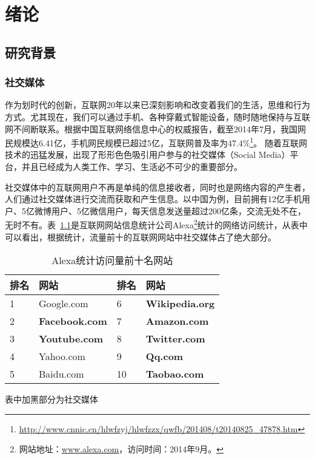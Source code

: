 \chapter{绪论}
\label{Intro}

\section{研究背景}

\subsection{社交媒体}
\label{ch1_social}
作为划时代的创新，互联网20年以来已深刻影响和改变着我们的生活，思维和行为方式。尤其现在，我们可以通过手机、各种穿戴式智能设备，随时随地保持与互联网不间断联系。根据中国互联网络信息中心的权威报告，截至2014年7月，我国网民规模达6.41亿，手机网民规模已超过5亿，互联网普及率为47.4\%\footnote{\url{http://www.cnnic.cn/hlwfzyj/hlwfzzx/qwfb/201408/t20140825\_47878.htm}}。
随着互联网技术的迅猛发展，出现了形形色色吸引用户参与的社交媒体（Social Media）平台，并且已经成为人类工作、学习、生活必不可少的重要部分。


社交媒体中的互联网用户不再是单纯的信息接收者，同时也是网络内容的产生者，人们通过社交媒体进行交流而获取和产生信息。以中国为例，目前拥有12亿手机用户、5亿微博用户、5亿微信用户，每天信息发送量超过200亿条，交流无处不在，无时不有。表~\ref{tab1-1}是互联网网站信息统计公司Alexa\footnote{网站地址：\url{www.alexa.com}，访问时间：2014年9月。}统计的网络访问统计，从表中可以看出，根据统计，流量前十的互联网网站中社交媒体占了绝大部分。

\begin{table}[htp]
\centering
\caption{Alexa统计访问量前十名网站}
\label{tab1-1}
\begin{threeparttable}
 \begin{tabular}{|l|l|l|l|}
 \hline
 排名&网站&排名&网站\\
 \hline
 1& Google.com& 6&\textbf{ Wikipedia.org\tnote{1}}\\
 2& \textbf{Facebook.com}& 7& \textbf{Amazon.com}\\
 3& \textbf{Youtube.com}& 8& \textbf{Twitter.com}\\
 4& Yahoo.com& 9& \textbf{Qq.com}\\
 5& Baidu.com& 10& \textbf{Taobao.com}\\
 \hline
\end{tabular}
\begin{tablenotes}
  \centering
  \footnotesize
\item[1]表中加黑部分为社交媒体
\end{tablenotes}
\end{threeparttable}
\end{table}

